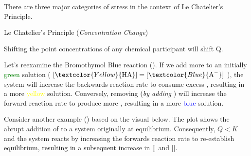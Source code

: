 \documentclass[10pt]{article}
\begin{document}
  There are three major categories of stress in the context of Le Chatelier's Principle.

  \begin{core}{Le Chatelier's Principle (\textit{Concentration Change})}
   
    Shifting the point concentrations of any chemical participant will shift Q.

    Let's reexamine the Bromothymol Blue reaction (). If we add more  to an initially \textcolor{Green}{green} solution ( $[\textcolor{Yellow}{\ce{HA}}] = [\textcolor{Blue}{\ce{A-}}]$ ), the system will increase the backwards reaction rate to consume excess , resulting in a more \textcolor{Yellow}{yellow} solution. Conversely, removing  (\textit{by adding }) will increase the forward reaction rate to  produce more , resulting in a more \textcolor{Blue}{blue} solution.

    Consider another example () based on the visual below. The plot shows the abrupt addition of  to a system originally at equilibrium. Consequently, $Q<K$ and the system reacts by increasing the forwards reaction rate to re-establish equilibrium, resulting in a subsequent increase in [] and [].

\end{core}
\end{document}
